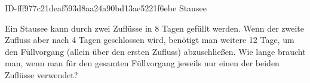 \begin{exercise}
      {ID-fff977c21deaf593d8aa24a90bd13ae5221f6ebe}
      {Stausee}
  \ifproblem\problem\par
    Ein Stausee kann durch zwei Zuflüsse in 8 Tagen gefüllt werden. Wenn
    der zweite Zufluss aber nach 4 Tagen geschlossen wird, benötigt man
    weitere 12 Tage, um den Füllvorgang (allein über den ersten Zufluss)
    abzuschließen. Wie lange braucht man, wenn man für den gesamten
    Füllvorgang jeweils nur einen der beiden Zuflüsse verwendet?
  \fi
\end{exercise}
